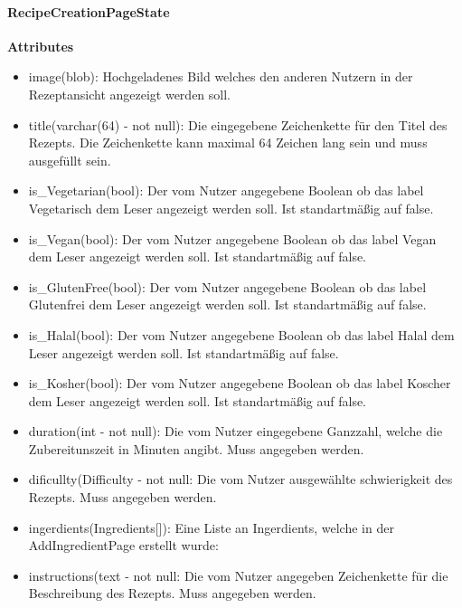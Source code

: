 \documentclass[parskip=full]{scrartcl}
\begin{document}
        \paragraph{RecipeCreationPageState}
            \textbf{Attributes}
                \begin{itemize}
                    \item image(blob): Hochgeladenes Bild welches den anderen Nutzern in der Rezeptansicht angezeigt werden soll.
                    \item title(varchar(64) - not null): Die eingegebene Zeichenkette für den Titel des Rezepts. Die Zeichenkette kann maximal 64 Zeichen lang sein und muss ausgefüllt sein.
                    \item is\_Vegetarian(bool): Der vom Nutzer angegebene Boolean ob das \gls{label} Vegetarisch dem Leser angezeigt werden soll. Ist standartmäßig auf false.
                    \item is\_Vegan(bool): Der vom Nutzer angegebene Boolean ob das \gls{label} Vegan dem Leser angezeigt werden soll. Ist standartmäßig auf false.
                    \item is\_GlutenFree(bool): Der vom Nutzer angegebene Boolean ob das \gls{label} Glutenfrei dem Leser angezeigt werden soll.  Ist standartmäßig auf false.
                    \item is\_Halal(bool): Der vom Nutzer angegebene Boolean ob das \gls{label} Halal dem Leser angezeigt werden soll.  Ist standartmäßig auf false.
                    \item is\_Kosher(bool): Der vom Nutzer angegebene Boolean ob das \gls{label} Koscher dem Leser angezeigt werden soll.  Ist standartmäßig auf false.
                    \item duration(int - not null): Die vom Nutzer eingegebene Ganzzahl, welche die Zubereitunszeit in Minuten angibt. Muss angegeben werden.
                    \item dificullty(Difficulty - not null: Die vom Nutzer ausgewählte \gls{schwierigkeit} des Rezepts. Muss angegeben werden.
                    \item ingerdients(Ingredients[]): Eine Liste an Ingerdients, welche in der AddIngredientPage erstellt wurde:
                    \item instructions(text - not null: Die vom Nutzer angegeben Zeichenkette für die Beschreibung des Rezepts. Muss angegeben werden.
                \end{itemize}
            
\end{document}
